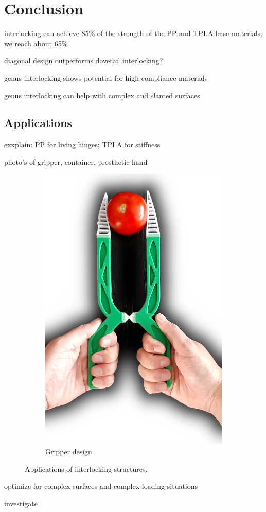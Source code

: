 \section{Conclusion}

interlocking can achieve 85\% of the strength of the PP and TPLA base materials; we reach about 65\%

diagonal design outperforms dovetail interlocking?

genus interlocking shows potential for high compliance materials

genus interlocking can help with complex and slanted surfaces 


\subsection{Applications}
exxplain: PP for living hinges; TPLA for stiffness


photo's of gripper, container, prosthetic hand 



\begin{figure}
	\centering
	\begin{subfigure}[B]{.33\columnwidth}
		\centering
		\includegraphics[width=\columnwidth]{sources/applications/gripper.jpg}
		\caption{Gripper design}
		\label{fig:gripper}
	\end{subfigure}
	\caption{Applications of interlocking structures.}
\end{figure}

optimize for complex surfaces and complex loading situations



investigate 